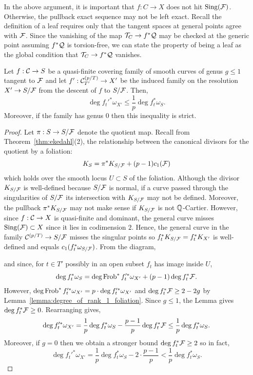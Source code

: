 \documentclass[main.tex]{subfiles}
\begin{document}
\begin{rmk}
In the above argument, it is important that $f : C \to X$ does not hit $\operatorname{\mathrm{Sing}}(\mathcal{F})$. Otherwise, the pullback exact sequence may not be left exact. Recall the definition of a leaf requires only that the tangent spaces at general points agree with $\mathcal{F}$. Since the vanishing of the map $\mathcal{T}_C \to f^* \mathcal{Q}$ may be checked at the generic point assuming $f^* \mathcal{Q}$ is torsion-free, we can state the property of being a leaf as the global condition that $\mathcal{T}_C \to f^* \mathcal{Q}$ vanishes. 
\end{rmk}


\begin{prop} \label{prop:decrease_canonical_degree_quotient}
Let $f : \mathcal{C} \to S$ be a quasi-finite covering family of smooth curves of genus $g \le 1$ tangent to $\mathcal{F}$ and let $f' : \mathcal{C}^{(p/T)}_{T'} \to X'$ be the induced family on the resolution $X' \to S / \mathcal{F}$ from the descent of $f$ to $S / \mathcal{F}$. Then,
\[ \deg{f_t'^* \omega_{X'}} \le \frac{1}{p} \deg{f_t^* \omega_S}. \] 
Moreover, if the family has genus $0$ then this inequality is strict.
\end{prop}

\begin{proof}
Let $\pi : S \to S/\mathcal{F}$ denote the quotient map. Recall from Theorem~\ref{thm:ekedahl}(2), the relationship between the canonical divisors for the quotient by a foliation: 
\[ K_S = \pi^* K_{S/\mathcal{F}} + (p-1) c_1(\mathcal{F}) \]
which holds over the smooth locus $U \subset S$ of the foliation. Although the divisor $K_{S/\mathcal{F}}$ is well-defined because $S/\mathcal{F}$ is normal, if a curve passed through the singularities of $S/\mathcal{F}$ its intersection with $K_{S/\mathcal{F}}$ may not be defined. Moreover, the pullback $\pi^* K_{S/\mathcal{F}}$ may not make sense if $K_{S/\mathcal{F}}$ is not $\mathbb{Q}$-Cartier. However, since $f : \mathcal{C} \to X$ is quasi-finite and dominant, the general curve misses $\operatorname{\mathrm{Sing}}(\mathcal{F}) \subset X$ since it lies in codimension $2$. Hence, the general curve in the family $\mathcal{C}^{(p/T)} \to S/\mathcal{F}$ misses the singular points so $f_t^* K_{S/\mathcal{F}} = f_t^* K_{X'}$ is well-defined and equals $c_1(f_t^* \omega_{S/\mathcal{F}})$. From the diagram,
\begin{center}
\end{center}
and since, for $t \in T'$ possibly in an open subset $f_t$ has image inside $U$,
\[ \deg{f_t^* \omega_S} = \deg{\operatorname{\mathrm{Frob}}^* f_t'^* \omega_{X'}} + (p-1) \deg{f_t^* \mathcal{F}}. \]
However, $\deg{\operatorname{\mathrm{Frob}}^* f_t'^* \omega_{X'}} = p \cdot \deg{f_t'^* \omega_{X'}}$ and $\deg{f_t^* \mathcal{F}} \ge 2-2g$ by Lemma~\ref{lemma:degree_of_rank_1_foliation}. Since $g \le 1$, the Lemma gives $\deg{f_t^* \mathcal{F}} \ge 0$. Rearranging gives,
\[  \deg{f_t'^* \omega_{X'}} = \frac{1}{p} \deg{f_t^* \omega_S} - \frac{p-1}{p} \deg{f_t^* \mathcal{F}} \le \frac{1}{p} \deg{f_t^* \omega_S}. \]
Moreover, if $g = 0$ then we obtain a stronger bound $\deg{f_t^* \mathcal{F}} \ge 2$ so in fact,
\[  \deg{f_t'^* \omega_{X'}} = \frac{1}{p} \deg{f_t^* \omega_S} - 2 \cdot \frac{p-1}{p}  < \frac{1}{p} \deg{f_t^* \omega_S}. \]
\end{proof}
\end{document}
